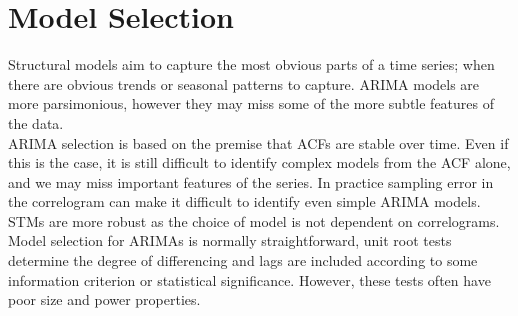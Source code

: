 \documentclass[DIV=14,titlepage=false]{scrreprt}
\begin{document}
\section{Model Selection}
Structural models aim to capture the most obvious parts of a time series; when there are obvious trends or seasonal patterns to capture. ARIMA models are more parsimonious, however they may miss some of the more subtle features of the data.\\
ARIMA selection is based on the premise that ACFs are stable over time. Even if this is the case, it is still difficult to identify complex models from the ACF alone, and we may miss important features of the series. In practice sampling error in the correlogram can make it difficult to identify even simple ARIMA models. STMs are more robust as the choice of model is not dependent on correlograms.\\
Model selection for ARIMAs is normally straightforward, unit root tests determine the degree of differencing and lags are included according to some information criterion or statistical significance. However, these tests often have poor size and power properties.
\end{document}
